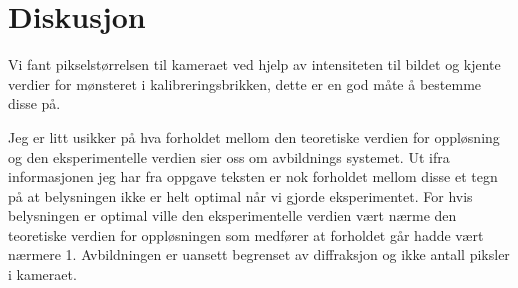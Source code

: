 \documentclass[norsk,a4paper,12pt]{article}
\begin{document}






\newpage
\section{Diskusjon}

Vi fant pikselstørrelsen til kameraet ved hjelp av intensiteten til bildet og kjente verdier for mønsteret i kalibreringsbrikken, dette er en god måte å bestemme disse på.  

Jeg er litt usikker på hva forholdet mellom den teoretiske verdien for oppløsning og den eksperimentelle verdien sier oss om avbildnings systemet. Ut ifra informasjonen jeg har fra oppgave teksten er nok forholdet mellom disse et tegn på at belysningen ikke er helt optimal når vi gjorde eksperimentet. For hvis belysningen er optimal ville den eksperimentelle verdien vært nærme den teoretiske verdien for oppløsningen som medfører at forholdet går hadde vært nærmere 1. Avbildningen er uansett begrenset av diffraksjon og ikke antall piksler i kameraet. 
\end{document}
